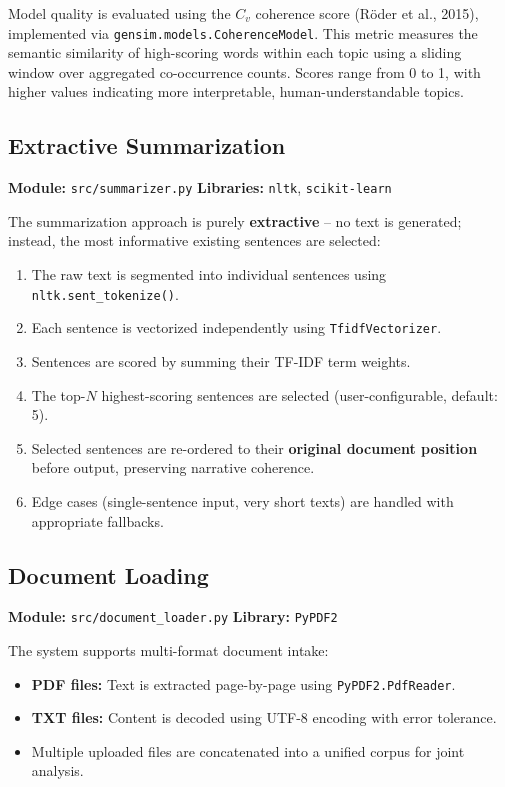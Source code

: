 \documentclass[12pt, a4paper]{article}
\begin{document}
Model quality is evaluated using the $C_v$ coherence score (Röder et al., 2015), implemented via \texttt{gensim.models.CoherenceModel}. This metric measures the semantic similarity of high-scoring words within each topic using a sliding window over aggregated co-occurrence counts. Scores range from 0 to 1, with higher values indicating more interpretable, human-understandable topics.

\subsection{Extractive Summarization}
\textbf{Module:} \texttt{src/summarizer.py} \quad \textbf{Libraries:} \texttt{nltk}, \texttt{scikit-learn}

The summarization approach is purely \textbf{extractive} -- no text is generated; instead, the most informative existing sentences are selected:

\begin{enumerate}
  \item The raw text is segmented into individual sentences using \texttt{nltk.sent\_tokenize()}.
  \item Each sentence is vectorized independently using \texttt{TfidfVectorizer}.
  \item Sentences are scored by summing their TF-IDF term weights.
  \item The top-$N$ highest-scoring sentences are selected (user-configurable, default: 5).
  \item Selected sentences are re-ordered to their \textbf{original document position} before output, preserving narrative coherence.
  \item Edge cases (single-sentence input, very short texts) are handled with appropriate fallbacks.
\end{enumerate}

\subsection{Document Loading}
\textbf{Module:} \texttt{src/document\_loader.py} \quad \textbf{Library:} \texttt{PyPDF2}

The system supports multi-format document intake:
\begin{itemize}
  \item \textbf{PDF files:} Text is extracted page-by-page using \texttt{PyPDF2.PdfReader}.
  \item \textbf{TXT files:} Content is decoded using UTF-8 encoding with error tolerance.
  \item Multiple uploaded files are concatenated into a unified corpus for joint analysis.
\end{itemize}
\end{document}
